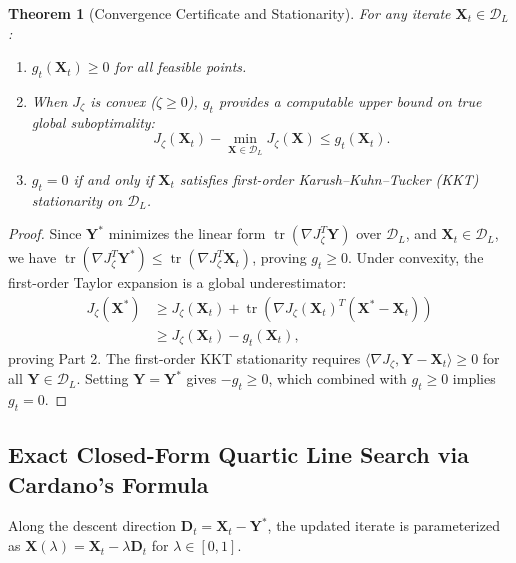 \documentclass[a4paper,fleqn]{cas-dc}
\theoremstyle{thmstyleone}
\newtheorem{theorem}{Theorem}
\theoremstyle{thmstyletwo}
\theoremstyle{thmstylethree}
\begin{document}
\begin{theorem}[Convergence Certificate and Stationarity]
\label{thm:duality_gap}
For any iterate $\mathbf{X}_t \in \mathcal{D}_L$:
\begin{enumerate}
    \item $g_t(\mathbf{X}_t) \ge 0$ for all feasible points.
    \item When $J_\zeta$ is convex ($\zeta \ge 0$), $g_t$ provides a computable upper bound on true global suboptimality:
    \begin{equation}
    J_\zeta(\mathbf{X}_t) - \min_{\mathbf{X} \in \mathcal{D}_L} J_\zeta(\mathbf{X}) \le g_t(\mathbf{X}_t).
    \label{eq:gap_bound}
    \end{equation}
    \item $g_t = 0$ if and only if $\mathbf{X}_t$ satisfies first-order Karush--Kuhn--Tucker (KKT) stationarity on $\mathcal{D}_L$.
\end{enumerate}
\end{theorem}
\begin{proof}
Since $\mathbf{Y}^*$ minimizes the linear form $\operatorname{tr}(\nabla J_\zeta^T \mathbf{Y})$ over $\mathcal{D}_L$, and $\mathbf{X}_t \in \mathcal{D}_L$, we have $\operatorname{tr}(\nabla J_\zeta^T \mathbf{Y}^*) \le \operatorname{tr}(\nabla J_\zeta^T \mathbf{X}_t)$, proving $g_t \ge 0$. Under convexity, the first-order Taylor expansion is a global underestimator:
\begin{align}
J_\zeta(\mathbf{X}^*) &\ge J_\zeta(\mathbf{X}_t) + \operatorname{tr}\left( \nabla J_\zeta(\mathbf{X}_t)^T (\mathbf{X}^* - \mathbf{X}_t) \right) \nonumber \\
&\ge J_\zeta(\mathbf{X}_t) - g_t(\mathbf{X}_t),
\end{align}
proving Part 2. The first-order KKT stationarity requires $\langle \nabla J_\zeta, \mathbf{Y} - \mathbf{X}_t \rangle \ge 0$ for all $\mathbf{Y} \in \mathcal{D}_L$. Setting $\mathbf{Y} = \mathbf{Y}^*$ gives $-g_t \ge 0$, which combined with $g_t \ge 0$ implies $g_t = 0$.
\end{proof}

\subsection{Exact Closed-Form Quartic Line Search via Cardano's Formula}
Along the descent direction $\mathbf{D}_t = \mathbf{X}_t - \mathbf{Y}^*$, the updated iterate is parameterized as $\mathbf{X}(\lambda) = \mathbf{X}_t - \lambda \mathbf{D}_t$ for $\lambda \in [0, 1]$.
\end{document}
